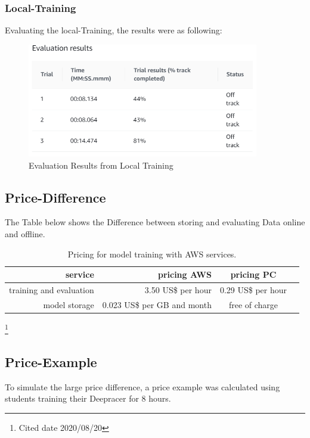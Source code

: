 \subsubsection{Local-Training}
Evaluating the local-Training, the results were as following: 

\begin{figure}[H]
    \centering
    \includegraphics[width=0.9\textwidth]{images/localEvaluation.PNG}
    \caption[]{Evaluation Results from Local Training}
    \label{fig:evLo}
\end{figure}
 
 
\subsection{Price-Difference}
The Table below shows the Difference between storing and evaluating Data online and offline.

\begin{table}[H]
\caption{Pricing for model training with AWS services.}
\label{tab:services}
\centering
\setlength{\tabcolsep}{5mm}
\def\arraystretch{1.25}
\begin{tabular}{|r|r|c|c|}
\hline
\textbf{service} & \textbf{pricing AWS} & \textbf{pricing PC} \\
\hline\hline
training and evaluation & 3.50 US\$ per hour & 0.29 US\$ per hour \\
\hline
model storage & 0.023 US\$ per GB and month & free of charge\\
\hline
\end{tabular}
\end{table}
\footnote{Cited date 2020/08/20}

\subsection{Price-Example}
To simulate the large price difference, a price example was calculated using students training their Deepracer for 8 hours.

